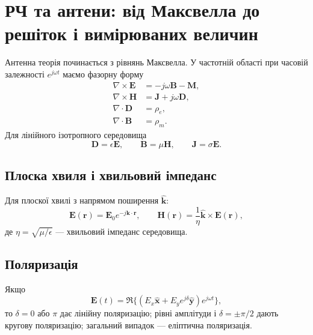 \chapter{РЧ та антени: від Максвелла до решіток і вимірюваних величин}
\label{chap:antenna-rf-stack}


Антенна теорія починається з рівнянь Максвелла. У частотній області при часовій залежності $e^{j\omega t}$ маємо фазорну форму
\begin{align}
 \nabla\times \mathbf{E} &= -j\omega \mathbf{B}-\mathbf{M},\\
 \nabla\times \mathbf{H} &= \mathbf{J}+j\omega \mathbf{D},\\
 \nabla\cdot\mathbf{D} &= \rho_e,\\
 \nabla\cdot\mathbf{B} &= \rho_m.
\end{align}
Для лінійного ізотропного середовища
\begin{equation}
 \mathbf{D}=\epsilon\mathbf{E},\qquad \mathbf{B}=\mu\mathbf{H},\qquad \mathbf{J}=\sigma\mathbf{E}.
\end{equation}

\section{Плоска хвиля і хвильовий імпеданс}

Для плоскої хвилі з напрямом поширення $\hat{\mathbf{k}}$:
\begin{equation}
 \mathbf{E}(\mathbf{r})=\mathbf{E}_0 e^{-j\mathbf{k}\cdot\mathbf{r}},\qquad
 \mathbf{H}(\mathbf{r})=\frac{1}{\eta}\hat{\mathbf{k}}\times\mathbf{E}(\mathbf{r}),
\end{equation}
де $\eta=\sqrt{\mu/\epsilon}$ --- хвильовий імпеданс середовища.

\section{Поляризація}

Якщо
\begin{equation}
 \mathbf{E}(t)=\Re\{(E_x\hat{\mathbf{x}}+E_y e^{j\delta}\hat{\mathbf{y}})e^{j\omega t}\},
\end{equation}
то $\delta=0$ або $\pi$ дає лінійну поляризацію; рівні амплітуди і $\delta=\pm\pi/2$ дають кругову поляризацію; загальний випадок --- еліптична поляризація.


